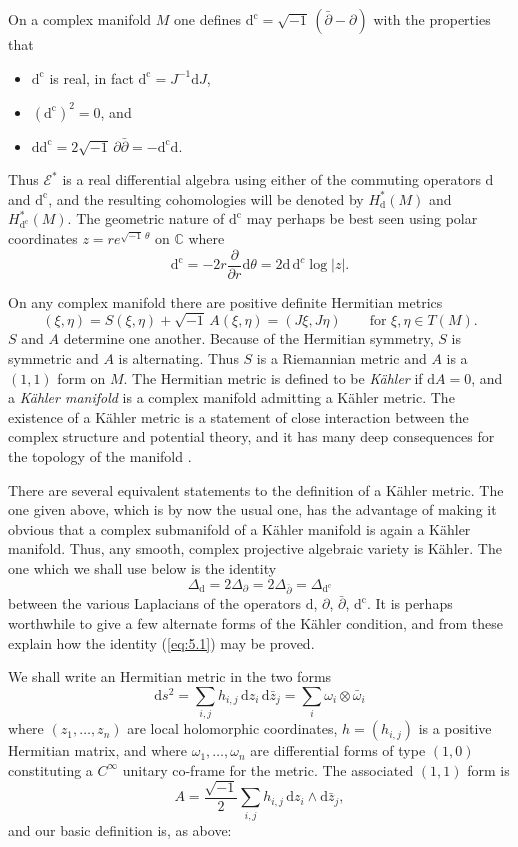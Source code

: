 \documentclass[11pt]{amsart}
\theoremstyle{plain}
\theoremstyle{definition}
\newcommand{\sE}{\mathscr{E}}
\newcommand{\dd}{\mathrm{d}}
\newcommand{\dc}{\mathrm{d}^{\mathrm{c}}}
\newcommand{\CC}{\mathbb{C}}
\begin{document}
On a complex manifold $M$ one defines $\dc = \sqrt{-1}\,(\bar{\partial} - \partial)$ with the properties that
\begin{itemize}
\item $\dc$ is real, in fact $\dc = J^{-1} \dd J$,
\item $(\dc)^{2} = 0$, and
\item $\dd\dc = 2\sqrt{-1}\, \partial\bar{\partial} = -\dc\dd$.
\end{itemize}
Thus $\sE^{*}$ is a real differential algebra using either of the commuting operators $\dd$ and $\dc$, and the resulting cohomologies will be denoted by $H^{*}_{\dd}(M)$ and $H^{*}_{\dc}(M)$. The geometric nature of $\dc$ may perhaps be best seen using polar coordinates $z = re^{\sqrt{-1}\,\theta}$ on $\CC$ where
\[
\dc = -2r \frac{\partial}{\partial r} \dd\theta = 2 \dd\, \dd^{c} \log|z|.
\]

On any complex manifold there are positive definite Hermitian metrics
\[
(\xi, \eta) = S(\xi, \eta) + \sqrt{-1}\, A(\xi, \eta) = (J\xi, J\eta) \qquad \text{for } \xi, \eta \in T(M).
\]
$S$ and $A$ determine one another. Because of the Hermitian symmetry, $S$ is symmetric and $A$ is alternating. Thus $S$ is a Riemannian metric and $A$ is a $(1,1)$ form on $M$. The Hermitian metric is defined to be \emph{K\"ahler} if $\dd A = 0$, and a \emph{K\"ahler manifold} is a complex manifold admitting a K\"ahler metric. The existence of a K\"ahler metric is a statement of close interaction between the complex structure and potential theory, and it has many deep consequences for the topology of the manifold \cite{W}.

There are several equivalent statements to the definition of a K\"ahler metric. The one given above, which is by now the usual one, has the advantage of making it obvious that a complex submanifold of a K\"ahler manifold is again a K\"ahler manifold. Thus, any smooth, complex projective algebraic variety is K\"ahler. The one which we shall use below is the identity
\begin{equation}\label{eq:5.1}
\Delta_{\dd} = 2\Delta_{\partial} = 2\Delta_{\bar{\partial}} = \Delta_{\dc}
\end{equation}
between the various Laplacians of the operators $\dd$, $\partial$, $\bar{\partial}$, $\dc$. It is perhaps worthwhile to give a few alternate forms of the K\"ahler condition, and from these explain how the identity (\ref{eq:5.1}) may be proved.

We shall write an Hermitian metric in the two forms
\[
\dd s^{2} = \sum_{i,j} h_{i,j}\, \dd z_{i}\, \dd\bar{z}_{j} = \sum_{i} \omega_{i} \otimes \bar{\omega}_{i}
\]
where $(z_{1}, \ldots, z_{n})$ are local holomorphic coordinates, $h = (h_{i,j})$ is a positive Hermitian matrix, and where $\omega_{1}, \ldots, \omega_{n}$ are differential forms of type $(1,0)$ constituting a $C^{\infty}$ unitary co-frame for the metric. The associated $(1,1)$ form is
\[
A = \frac{\sqrt{-1}}{2} \sum_{i,j} h_{i,j}\, \dd z_{i} \wedge \dd\bar{z}_{j},
\]
and our basic definition is, as above:
\end{document}
